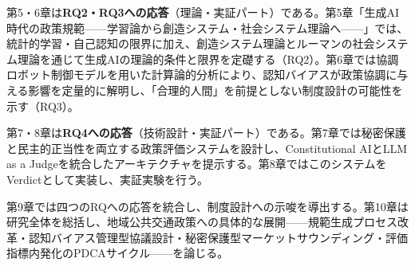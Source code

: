 第5・6章は\textbf{RQ2・RQ3への応答}（理論・実証パート）である。第5章「生成AI時代の政策規範——学習論から創造システム・社会システム理論へ——」では、統計的学習・自己認知の限界に加え、創造システム理論とルーマンの社会システム理論を通じて生成AIの理論的条件と限界を定礎する（RQ2）。第6章では協調ロボット制御モデルを用いた計算論的分析により、認知バイアスが政策協調に与える影響を定量的に解明し、「合理的人間」を前提としない制度設計の可能性を示す（RQ3）。

第7・8章は\textbf{RQ4への応答}（技術設計・実証パート）である。第7章では秘密保護と民主的正当性を両立する政策評価システムを設計し、Constitutional AIとLLM as a Judgeを統合したアーキテクチャを提示する。第8章ではこのシステムをVerdictとして実装し、実証実験を行う。

第9章では四つのRQへの応答を統合し、制度設計への示唆を導出する。第10章は研究全体を総括し、地域公共交通政策への具体的な展開——規範生成プロセス改革・認知バイアス管理型協議設計・秘密保護型マーケットサウンディング・評価指標内発化のPDCAサイクル——を論じる。


\printbibliography[heading=subbibliography,title={章末参考文献}]
